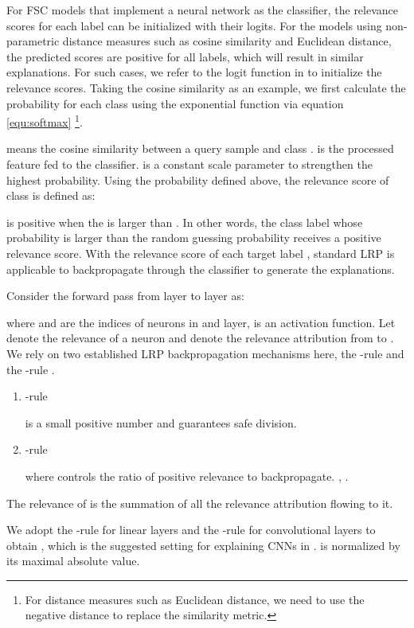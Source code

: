 \documentclass[a4paper,conference]{IEEEtran}
\begin{document}
For FSC models that implement a neural network as the classifier, the relevance scores for each label can be initialized with their logits. For the models using non-parametric distance measures such as cosine similarity and Euclidean distance, the predicted scores are positive for all labels, which will result in similar explanations.
For such cases, we refer to the logit function in \cite{Explainkmeans:kauffmann2019clustering} to initialize the relevance scores. Taking the cosine similarity as an example, we first calculate the probability for each class using the exponential function via equation \eqref{equ:softmax} \footnote{For distance measures such as Euclidean distance, we need to use the negative distance to replace the similarity metric.}.

 means the cosine similarity between a query sample and class .  is the processed feature fed to the classifier.  is a constant scale parameter to strengthen the highest probability. Using the  probability defined above, the relevance score of class  is defined as:

 is positive when the  is larger than . In other words, the class label whose probability is larger than the random guessing probability receives a positive relevance score. 
With the relevance score of each target label , standard LRP is applicable to backpropagate  through the classifier to generate the explanations. 

Consider the forward pass from layer  to layer  as:

where  and  are the indices of neurons in  and  layer,  is an activation function. Let  denote the relevance of a neuron and  denote the relevance attribution from  to .  We rely on two established LRP backpropagation mechanisms here, the -rule and the -rule \cite{LRP:bach2015pixel}.
\begin{enumerate}
    \item -rule

 is a small positive number and  guarantees safe division.
\item -rule

where  controls the ratio of positive relevance to backpropagate. 
, .  
\end{enumerate}
The relevance of  is the summation of all the relevance attribution flowing to it.

We adopt the -rule for linear layers and the -rule for convolutional layers to obtain , which is the suggested setting for explaining CNNs in \cite{SebasIJCNN2020:kohlbrenner2019towards}.
 is normalized by its maximal absolute value.
\end{document}
